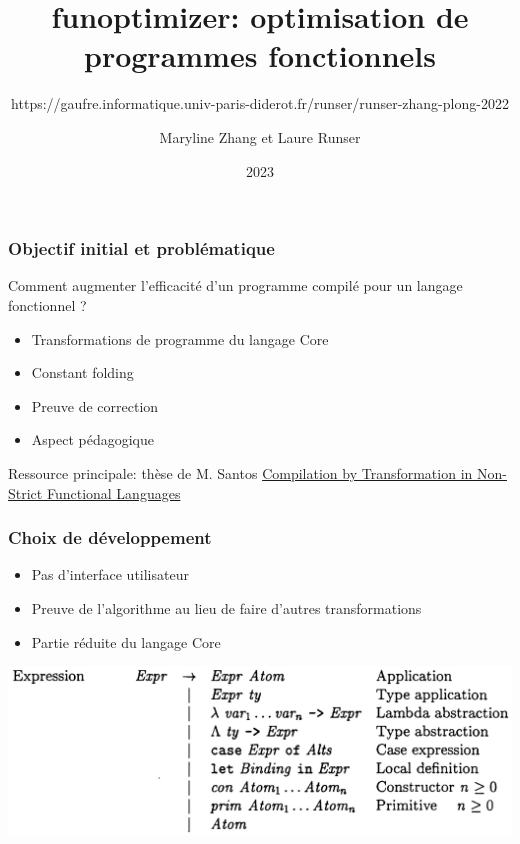 \documentclass{beamer}
\title{funoptimizer: optimisation de programmes fonctionnels}
\author{Maryline Zhang et Laure Runser}
\subtitle{https://gaufre.informatique.univ-paris-diderot.fr/runser/runser-zhang-plong-2022}
\institute{Université de Paris}
\date{2023}
\begin{document}
\frame{\titlepage}
\begin{frame}
\frametitle{Objectif initial et problématique}
Comment augmenter l’efficacité d’un programme compilé pour un langage fonctionnel ?
\begin{itemize}
    \item Transformations de programme du langage Core
    \item Constant folding
    \item Preuve de correction
    \item Aspect pédagogique
\end{itemize}
Ressource principale: thèse de M. Santos 
\underline{Compilation by Transformation in Non-Strict Functional Languages}
\end{frame}
\begin{frame}
\frametitle{Choix de développement}
\begin{itemize}
    \item Pas d'interface utilisateur
    \item Preuve de l'algorithme au lieu de faire d'autres transformations 
    \item Partie réduite du langage Core
\end{itemize}

\includegraphics[width=1\textwidth]{pics/core.png}
\end{frame}
\end{document}
